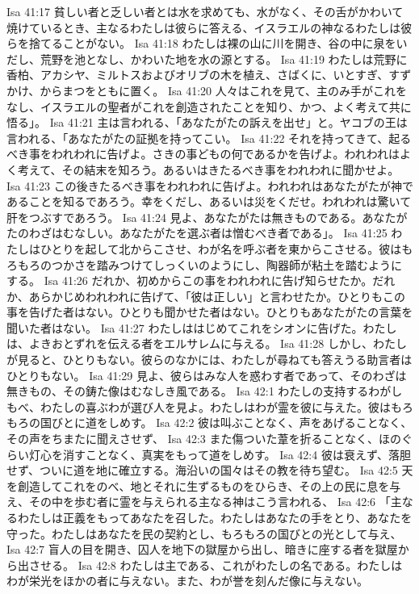 Isa 41:17  貧しい者と乏しい者とは水を求めても、水がなく、その舌がかわいて焼けているとき、主なるわたしは彼らに答える、イスラエルの神なるわたしは彼らを捨てることがない。
Isa 41:18  わたしは裸の山に川を開き、谷の中に泉をいだし、荒野を池となし、かわいた地を水の源とする。
Isa 41:19  わたしは荒野に香柏、アカシヤ、ミルトスおよびオリブの木を植え、さばくに、いとすぎ、すずかけ、からまつをともに置く。
Isa 41:20  人々はこれを見て、主のみ手がこれをなし、イスラエルの聖者がこれを創造されたことを知り、かつ、よく考えて共に悟る」。
Isa 41:21  主は言われる、「あなたがたの訴えを出せ」と。ヤコブの王は言われる、「あなたがたの証拠を持ってこい。
Isa 41:22  それを持ってきて、起るべき事をわれわれに告げよ。さきの事どもの何であるかを告げよ。われわれはよく考えて、その結末を知ろう。あるいはきたるべき事をわれわれに聞かせよ。
Isa 41:23  この後きたるべき事をわれわれに告げよ。われわれはあなたがたが神であることを知るであろう。幸をくだし、あるいは災をくだせ。われわれは驚いて肝をつぶすであろう。
Isa 41:24  見よ、あなたがたは無きものである。あなたがたのわざはむなしい。あなたがたを選ぶ者は憎むべき者である」。
Isa 41:25  わたしはひとりを起して北からこさせ、わが名を呼ぶ者を東からこさせる。彼はもろもろのつかさを踏みつけてしっくいのようにし、陶器師が粘土を踏むようにする。
Isa 41:26  だれか、初めからこの事をわれわれに告げ知らせたか。だれか、あらかじめわれわれに告げて、「彼は正しい」と言わせたか。ひとりもこの事を告げた者はない。ひとりも聞かせた者はない。ひとりもあなたがたの言葉を聞いた者はない。
Isa 41:27  わたしははじめてこれをシオンに告げた。わたしは、よきおとずれを伝える者をエルサレムに与える。
Isa 41:28  しかし、わたしが見ると、ひとりもない。彼らのなかには、わたしが尋ねても答えうる助言者はひとりもない。
Isa 41:29  見よ、彼らはみな人を惑わす者であって、そのわざは無きもの、その鋳た像はむなしき風である。
Isa 42:1  わたしの支持するわがしもべ、わたしの喜ぶわが選び人を見よ。わたしはわが霊を彼に与えた。彼はもろもろの国びとに道をしめす。
Isa 42:2  彼は叫ぶことなく、声をあげることなく、その声をちまたに聞えさせず、
Isa 42:3  また傷ついた葦を折ることなく、ほのぐらい灯心を消すことなく、真実をもって道をしめす。
Isa 42:4  彼は衰えず、落胆せず、ついに道を地に確立する。海沿いの国々はその教を待ち望む。
Isa 42:5  天を創造してこれをのべ、地とそれに生ずるものをひらき、その上の民に息を与え、その中を歩む者に霊を与えられる主なる神はこう言われる、
Isa 42:6  「主なるわたしは正義をもってあなたを召した。わたしはあなたの手をとり、あなたを守った。わたしはあなたを民の契約とし、もろもろの国びとの光として与え、
Isa 42:7  盲人の目を開き、囚人を地下の獄屋から出し、暗きに座する者を獄屋から出させる。
Isa 42:8  わたしは主である、これがわたしの名である。わたしはわが栄光をほかの者に与えない。また、わが誉を刻んだ像に与えない。
